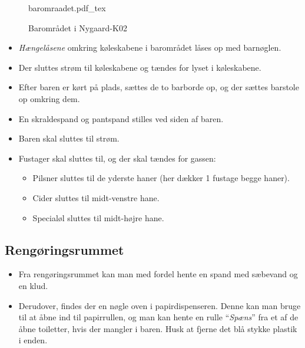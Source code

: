 \begin{figure}[t]
	\centering
	\def\svgwidth{\columnwidth}
	{\small{baromraadet.pdf_tex}}
	\caption{Barområdet i Nygaard-K02}
	\label{fig:baromraadet}
\end{figure}

\begin{itemize}
    \item \textit{Hængelåsene} omkring køleskabene i barområdet låses op med barnøglen.
	\item Der sluttes strøm til køleskabene og tændes for lyset i køleskabene.
	\item Efter baren er kørt på plads, sættes de to barborde op, og der sættes barstole op omkring dem.
	\item En skraldespand og pantspand stilles ved siden af baren.
	\item Baren skal sluttes til strøm.
	\item Fustager skal sluttes til, og der skal tændes for gassen:
	\begin{itemize}
		\item Pilsner sluttes til de yderste haner (her dækker 1 fustage begge haner).
		\item Cider sluttes til midt-venstre hane.
		\item Specialøl sluttes til midt-højre hane.
	\end{itemize}
\end{itemize}

\subsection{Rengøringsrummet}
\label{sec:pre:rengøring}

\begin{itemize}
	\item Fra rengøringsrummet kan man med fordel hente en spand med sæbevand og en klud.
	\item Derudover, findes der en nøgle oven i papirdispenseren. Denne kan man bruge til
	at åbne ind til papirrullen, og man kan hente en rulle ``\textit{Spæns}''
	fra et af de åbne toiletter, hvis der mangler i baren. 
	Husk at fjerne det blå stykke plastik i enden.
\end{itemize}
